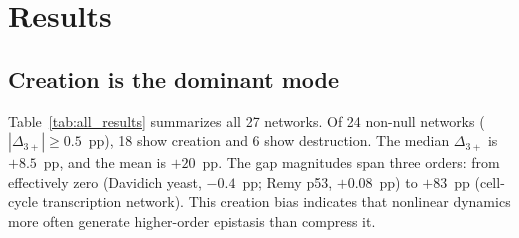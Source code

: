 \documentclass[11pt]{article}
\begin{document}
\section{Results}
\label{sec:results}

\subsection{Creation is the dominant mode}

Table~\ref{tab:all_results} summarizes all 27 networks. Of 24
non-null networks ($|\Delta_{3+}| \geq 0.5$~pp), 18 show creation
and 6 show destruction. The median $\Delta_{3+}$ is $+8.5$~pp, and
the mean is $+20$~pp. The gap magnitudes span three orders: from
effectively zero (Davidich yeast, $-0.4$~pp; Remy p53, $+0.08$~pp)
to $+83$~pp (cell-cycle transcription network). This creation bias
indicates that nonlinear dynamics more often generate higher-order
epistasis than compress it.
\end{document}
